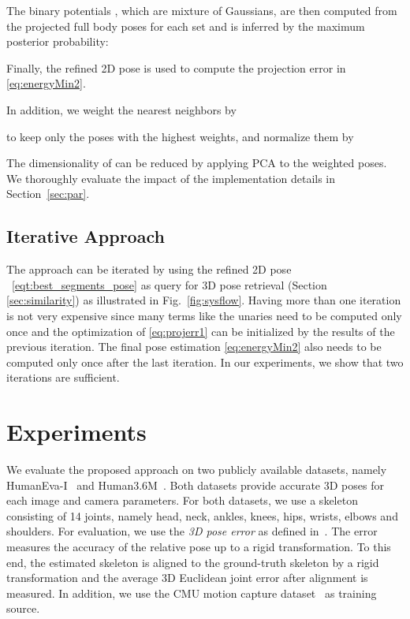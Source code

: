 \documentclass[10pt,twocolumn,letterpaper]{article}
\begin{document}
The binary potentials , which are mixture of Gaussians, are then computed from the projected full body poses for each set and  is inferred by the maximum posterior probability:

Finally, the refined 2D pose  is used to compute the projection error  in \eqref{eq:energyMin2}. 

In addition, we weight the nearest neighbors by

to keep only the  poses with the highest weights, and normalize them by

The dimensionality of  can be reduced by applying PCA to the weighted poses.
We thoroughly evaluate the impact of the implementation details in Section~\ref{sec:par}.




















\subsection{Iterative Approach}\label{sec:iter}
The approach can be iterated by using the refined 2D pose ~\eqref{eqt:best_segments_pose} as query for 3D pose retrieval (Section \ref{sec:similarity}) as illustrated in Fig.~\ref{fig:sysflow}. Having more than one iteration is not very expensive since many terms like the unaries need to be computed only once and the optimization of \eqref{eq:projerr1} can be initialized by the results of the previous iteration. The final pose estimation \eqref{eq:energyMin2} also needs to be computed only once after the last iteration. In our experiments, we show that two iterations are sufficient.
\section{Experiments}\label{sec:exp}
We evaluate the proposed approach on two publicly available datasets, namely HumanEva-I~\cite{Sigal_2010} and Human3.6M~\cite{h36m_pami}.
Both datasets provide accurate 3D poses for each image and camera parameters. For both datasets, we use a skeleton consisting of 14 joints, namely head, neck, ankles, knees, hips, wrists, elbows and shoulders.
For evaluation, we use the \textit{3D pose error} as defined in~\cite{SimoSerraCVPR2012}. The error measures the accuracy of the relative pose up to a rigid transformation. To this end, the estimated skeleton is aligned to the ground-truth skeleton by a rigid transformation and the average 3D Euclidean joint error after alignment is measured. In addition, we use the CMU motion capture dataset~\cite{cmu_mocap} as training source.
\end{document}
